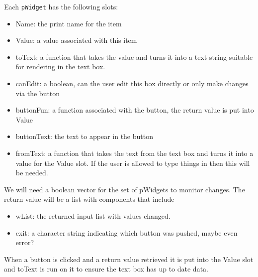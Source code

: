 \documentclass{article}
\begin{document}
Each \verb+pWidget+ has the following slots:
\begin{itemize}
\item Name: the print name for the item
\item Value: a value associated with this item
\item toText: a function that takes the value and turns it into a text
  string suitable for rendering in the text box.
\item canEdit: a boolean, can the user edit this box directly or only
  make changes via the button
\item buttonFun: a function associated with the button, the return
  value is put into Value
\item buttonText: the text to appear in the button
\item fromText: a function that takes the text from the text box and
  turns it into a value for the Value slot. If the user is allowed to
  type things in then this will be needed.
\end{itemize}

We will need a boolean vector for the set of pWidgets to monitor
changes.
The return value will be a list with components that include
\begin{itemize}
\item wList: the returned input list with values changed.
\item exit: a character string indicating which button was pushed,
  maybe even error?
\end{itemize}

When a button is clicked and a return value retrieved it is put into
the Value slot and toText is run on it to ensure the text box has up
to date data.
\end{document}
